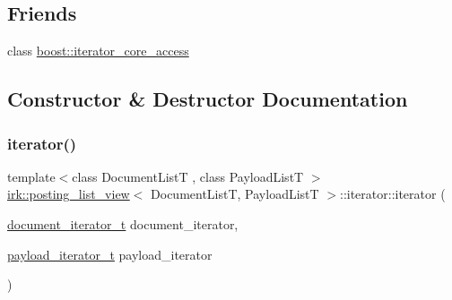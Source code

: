 \subsection*{Friends}
\begin{DoxyCompactItemize}
\item 
class \mbox{\hyperlink{classirk_1_1posting__list__view_1_1iterator_ac09f73e325921cc50ebcd96bed0f8096}{boost\+::iterator\+\_\+core\+\_\+access}}
\end{DoxyCompactItemize}


\subsection{Constructor \& Destructor Documentation}
\mbox{\label{classirk_1_1posting__list__view_1_1iterator_a0735df34097a1113f0295d27791f985d}} 
\subsubsection{\texorpdfstring{iterator()}{iterator()}\hspace{0.1cm}{\footnotesize\ttfamily [1/2]}}
{\footnotesize\ttfamily template$<$class Document\+ListT , class Payload\+ListT $>$ \\
\mbox{\hyperlink{classirk_1_1posting__list__view}{irk\+::posting\+\_\+list\+\_\+view}}$<$ Document\+ListT, Payload\+ListT $>$\+::iterator\+::iterator (\begin{DoxyParamCaption}\item[{\mbox{\hyperlink{classirk_1_1posting__list__view_abaca622760e6da2c67d55cf35207250f}{document\+\_\+iterator\+\_\+t}}}]{document\+\_\+iterator,  }\item[{\mbox{\hyperlink{classirk_1_1posting__list__view_a5a153169348a164ea2cb1a18dc76e279}{payload\+\_\+iterator\+\_\+t}}}]{payload\+\_\+iterator }\end{DoxyParamCaption})\hspace{0.3cm}{\ttfamily [inline]}}

\mbox{\label{classirk_1_1posting__list__view_1_1iterator_aa4053b60f98871ed18bf6bfb87dfdd18}} 
